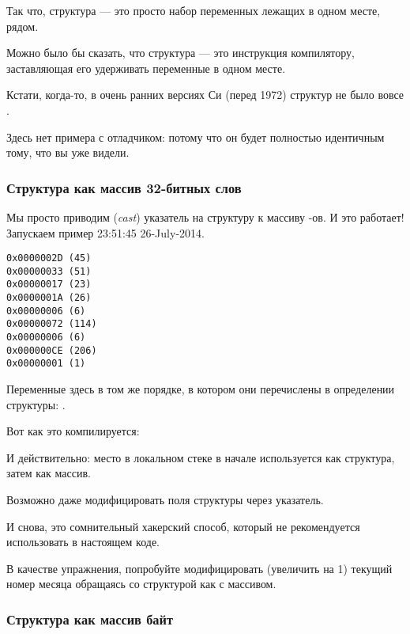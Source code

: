 Так что, структура --- это просто набор переменных лежащих в одном месте, рядом.

Можно было бы сказать, что структура --- это инструкция компилятору, заставляющая его удерживать переменные в одном месте.

Кстати, когда-то, в очень ранних версиях Си (перед 1972) структур не было вовсе \RitchieDevC.

Здесь нет примера с отладчиком: потому что он будет полностью идентичным тому, что вы уже видели.

\subsubsection{Структура как массив 32-битных слов}



Мы просто приводим (\emph{cast}) указатель на структуру к массиву \Tint{}-ов.
И это работает!
Запускаем пример 23:51:45 26-July-2014.

\begin{lstlisting}[label=GCC_tm3_output]
0x0000002D (45)
0x00000033 (51)
0x00000017 (23)
0x0000001A (26)
0x00000006 (6)
0x00000072 (114)
0x00000006 (6)
0x000000CE (206)
0x00000001 (1)
\end{lstlisting}

Переменные здесь в том же порядке, в котором они перечислены в определении структуры: .

Вот как это компилируется:



И действительно: место в локальном стеке в начале используется как структура, затем как массив.

Возможно даже модифицировать поля структуры через указатель.

И снова, это сомнительный хакерский способ, который не рекомендуется использовать в настоящем коде.

\mysubparagraph{\Exercise}

В качестве упражнения, попробуйте модифицировать (увеличить на 1) 
текущий номер месяца обращаясь со структурой как с массивом.

\subsubsection{Структура как массив байт}

